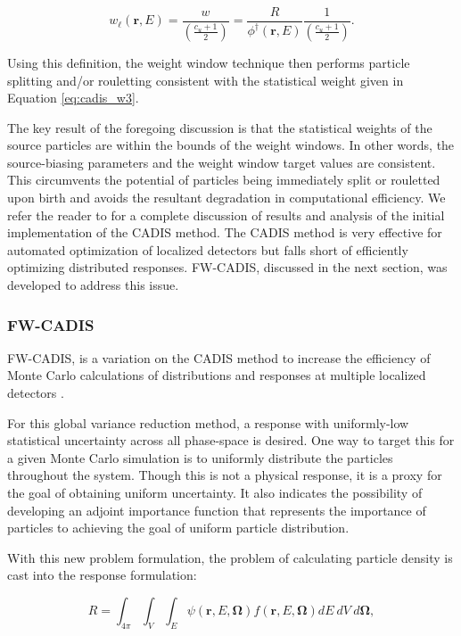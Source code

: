 \documentclass{article} %
\newcommand{\bo}{\mathbf\Omega}
\newcommand{\vecr}{\textbf{r}}
\newcommand{\fwc}{\mbox{FW-CADIS}}
\begin{document}
\begin{equation}
w_{\ell}(\vecr,E) = \frac{w}{\left(\frac{c_u +1}{2}\right)} 
= \frac{R}{\phi^{\dagger}(\vecr,E)}\frac{1}{\left(\frac{c_u +1}{2}\right)}.
\label{eq:cadis_tb}
\end{equation}

\noindent Using this definition, the weight window technique then performs
particle splitting and/or rouletting consistent with the statistical weight
given in Equation \ref{eq:cadis_w3}.

The key result of the foregoing discussion is that the statistical weights of
the source particles are within the bounds of the weight windows. In other
words, the source-biasing parameters and the weight window target values are
consistent. This circumvents the potential of particles being immediately split
or rouletted upon birth and avoids the resultant degradation in computational
efficiency. We refer the reader to \cite{cadis} for a complete discussion of
results and analysis of the initial implementation of the CADIS method. The
CADIS method is very effective for automated optimization of localized
detectors but falls short of efficiently optimizing distributed responses.
\fwc, discussed in the next section, was developed to address this issue.

\subsubsection{\fwc}

\fwc, is a variation on the CADIS method to increase the efficiency of Monte
Carlo calculations of distributions and responses at multiple localized
detectors \cite{fwcadis}.

For this global variance reduction method, a response with uniformly-low
statistical uncertainty across all phase-space is desired. One way to target
this for a given Monte Carlo simulation is to uniformly distribute the
particles throughout the system. Though this is not a physical response, it is
a proxy for the goal of obtaining uniform uncertainty. It also indicates the
possibility of developing an adjoint importance function that represents the
importance of particles to achieving the goal of uniform particle distribution.

With this new problem formulation, the problem of calculating particle density
is cast into the response formulation:

\begin{equation}
R = \int_{4\pi}\int_{V}\int_{E}\psi(\vecr,E,\bo)f(\vecr,E,\bo)dE\ dV\ d\bo,
\end{equation}
\end{document}
